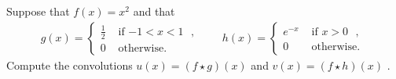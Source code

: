 \documentclass[11pt]{article}
\begin{document}
\begin{exercise}
    Suppose that $f(x) = x^2$ and that
    \begin{align*}
        g(x) = \left\{\begin{array}{cc} \frac 1 2 & \text{ if $-1 < x < 1$ }, \\ 0 & \text{ otherwise. } \end{array}\right.
        \qquad 
        h(x) = \left\{\begin{array}{cc} e^{-x} & \text{ if $x > 0$ }, \\ 0 & \text{ otherwise. } \end{array}\right.
    \end{align*}
    Compute the convolutions $u(x) = (f \star g)(x)$ and $v(x) = (f \star h)(x)$ .
\end{exercise}
\end{document}
